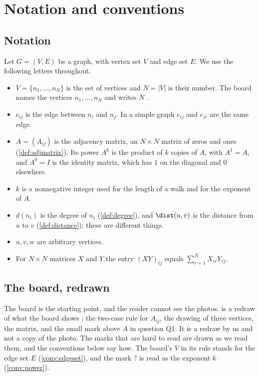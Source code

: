 \section{Notation and conventions}\label{sec:conventions}

\subsection{Notation}

Let $G=(V,E)$ be a graph, with vertex set $V$ and edge set $E$. We use the following letters throughout.

\begin{itemize}[leftmargin=1.5em]
  \item $V=\{n_1,\dots,n_N\}$ is the set of vertices and $N=|V|$ is their
  number. The board names the vertices $n_1,\dots,n_N$ and writes $N$
  \cite{whiteboard1}.
  \item $e_{ij}$ is the edge between $n_i$ and $n_j$. In a simple graph
  $e_{ij}$ and $e_{ji}$ are the same edge.
  \item $A=(A_{ij})$ is the adjacency matrix, an $N\times N$ matrix of zeros
  and ones (\cref{def:adjmatrix}). Its power $A^k$ is the product of $k$
  copies of $A$, with $A^1=A$, and $A^0=I$ is the identity matrix, which has
  $1$ on the diagonal and $0$ elsewhere.
  \item $k$ is a nonnegative integer used for the length of a walk and for
  the exponent of $A$.
    \item $d(n_i)$ is the degree of $n_i$ (\cref{def:degree}), and $\dist(u,v)$ is the
  distance from $u$ to $v$ (\cref{def:distance}); these are different things.
  \item $u,v,w$ are arbitrary vertices.
  \item For $N\times N$ matrices $X$ and $Y$ the entry $(XY)_{ij}$ equals
  $\sum_{r=1}^{N}X_{ir}Y_{rj}$.
\end{itemize}

\subsection{The board, redrawn}

The board is the starting point, and the reader cannot see the photos.
 is a redraw of what the board shows
\cite{whiteboard1,whiteboard2}: the two-case rule for $A_{ij}$, the drawing of
three vertices, the matrix, and the small mark above $A$ in question Q1. It is a
redraw by us and not a copy of the photo. The marks that are hard to read are
drawn as we read them, and the conventions below say how. The board's $V$ in its
rule stands for the edge set $E$ (\cref{conv:edgeset}), and the mark $?$ is read as
the exponent $k$ (\cref{conv:power}).

